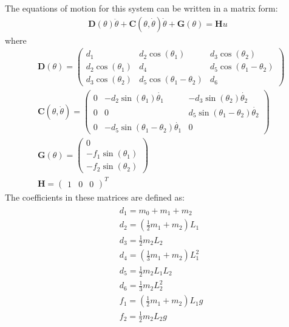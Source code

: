 \documentclass{article}
\theoremstyle{plain}
\theoremstyle{definition}
\theoremstyle{remark}
\begin{document}
The equations of motion \cite{DIPCShort} for this system can be written in a matrix form:
\begin{gather*}
    \textbf{D}(\theta)\ddot{\theta}+\textbf{C}(\theta,\dot{\theta})\dot{\theta}+\textbf{G}(\theta)=\textbf{H}u
\end{gather*}
where
\begin{equation}
    \label{DIPC_mat}
    \begin{split}
        &\textbf{D}(\theta)=\begin{pmatrix}
            d_1 & d_2\cos(\theta_1) & d_3\cos(\theta_2) \\
            d_2\cos(\theta_1) & d_4 & d_5\cos(\theta_1-\theta_2) \\
            d_3\cos(\theta_2) & d_5\cos(\theta_1-\theta_2) & d_6
        \end{pmatrix} \\
        &\textbf{C}(\theta,\dot{\theta})=\begin{pmatrix}
            0 & -d_2\sin(\theta_1)\dot{\theta_1} & -d_3\sin(\theta_2)\dot{\theta_2} \\
            0 & 0 & d_5\sin(\theta_1-\theta_2)\dot{\theta_2} \\
            0 & -d_5\sin(\theta_1-\theta_2)\dot{\theta_1} & 0
        \end{pmatrix} \\
        &\textbf{G}(\theta)=\begin{pmatrix}
            0 \\
            -f_1\sin(\theta_1) \\
            -f_2\sin(\theta_2)
        \end{pmatrix} \\
        &\textbf{H}=\begin{pmatrix}
            1 & 0 & 0
        \end{pmatrix}^T
    \end{split}
\end{equation}
The coefficients in these matrices are defined as:
\begin{gather*}
    \begin{aligned}
        &d_1 = m_0 + m_1 + m_2 \\
        &d_2 = (\frac{1}{2}m_1 + m_2)L_1 \\
        &d_3 = \frac{1}{2}m_2L_2 \\
        &d_4 = (\frac{1}{3}m_1 + m_2)L_1^2 \\
        &d_5 = \frac{1}{2}m_2L_1L_2 \\
        &d_6 = \frac{1}{3}m_2L_2^2 \\
        &f_1 = (\frac{1}{2}m_1 + m_2)L_1g \\
        &f_2 = \frac{1}{2}m_2L_2g
    \end{aligned}
\end{gather*}
\end{document}
